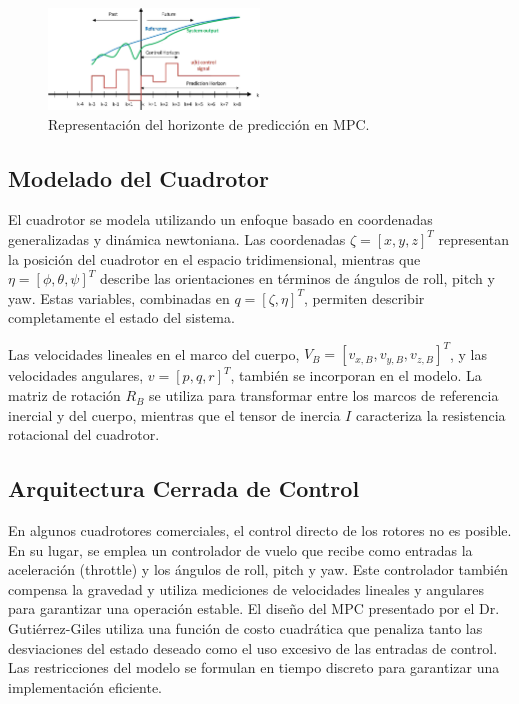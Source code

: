 \documentclass[conference]{IEEEtran}
\begin{document}
\begin{figure}[h]
    \centering
    \includegraphics[width=0.5\textwidth]{predictionHorizon.png}
    \caption{Representación del horizonte de predicción en MPC.}
\end{figure}

\subsection*{Modelado del Cuadrotor}

El cuadrotor se modela utilizando un enfoque basado en coordenadas generalizadas y dinámica newtoniana. Las coordenadas $\zeta = [x, y, z]^T$ representan la posición del cuadrotor en el espacio tridimensional, mientras que $\eta = [\phi, \theta, \psi]^T$ describe las orientaciones en términos de ángulos de roll, pitch y yaw. Estas variables, combinadas en $q = [\zeta, \eta]^T$, permiten describir completamente el estado del sistema.

Las velocidades lineales en el marco del cuerpo, $V_B = [v_{x,B}, v_{y,B}, v_{z,B}]^T$, y las velocidades angulares, $v = [p, q, r]^T$, también se incorporan en el modelo. La matriz de rotación $R_B$ se utiliza para transformar entre los marcos de referencia inercial y del cuerpo, mientras que el tensor de inercia $I$ caracteriza la resistencia rotacional del cuadrotor.

\subsection*{Arquitectura Cerrada de Control}

En algunos cuadrotores comerciales, el control directo de los rotores no es posible. En su lugar, se emplea un controlador de vuelo que recibe como entradas la aceleración (throttle) y los ángulos de roll, pitch y yaw. Este controlador también compensa la gravedad y utiliza mediciones de velocidades lineales y angulares para garantizar una operación estable. El diseño del MPC presentado por el Dr. Gutiérrez-Giles utiliza una función de costo cuadrática que penaliza tanto las desviaciones del estado deseado como el uso excesivo de las entradas de control. Las restricciones del modelo se formulan en tiempo discreto para garantizar una implementación eficiente.
\end{document}

